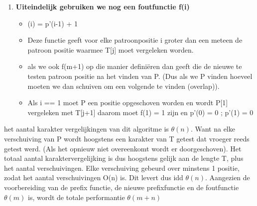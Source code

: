 \begin{enumerate}
\item \textbf{Uiteindelijk gebruiken we nog een foutfunctie f(i)}
\begin{itemize}
\item (i) = p'(i-1) + 1
\item Deze functie geeft voor elke patroonpositie i groter dan een meteen de patroon positie waarmee T[j] moet vergeleken worden.
\item als we ook f(m+1) op die manier defini\"eren dan geeft die de nieuwe te testen patroon positie na het vinden van P. (Dus als we P vinden hoeveel moeten we dan schuiven om een volgende te vinden (overlap)).
\item Als i == 1 moet P een positie opgeschoven worden en wordt P[1] vergeleken met T[j+1] daarom moet f(1) = 1 zijn en p'(0) = 0 ; p'(1)  = 0
\end{itemize}
\end{enumerate}

het aantal karakter vergelijkingen van dit algoritme is $\theta(n)$. Want na elke verschuiving van P wordt hoogstens een karakter van T getest dat vroeger reeds getest werd. (Als het opnieuw niet overeenkomt wordt er doorgeschoven). Het totaal aantal karaktervergelijking is dus hoogstens gelijk aan de lengte T, plus het aantal verschuivingen. Elke verschuiving gebeurd over minstens 1 positie, zodat het aantal verschuivingen O(n) is. Dit levert dus idd $\theta(n)$.
\npar
Aangezien de voorbereiding van de prefix functie, de nieuwe prefixfunctie en de foutfunctie $\theta(m)$ is, wordt de totale performantie $\theta(m+n)$